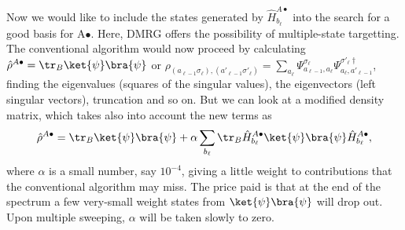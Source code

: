 Now we would like to include the states generated by $\hat{H}^{A\bullet}_{b_{\ell}}$ into the search for a good basis for A$\bullet$. Here, DMRG offers the possibility of multiple-state targetting. The conventional algorithm would now proceed by calculating $\hat{\rho}^{A\bullet} = \tr_B \ket{\psi}\bra{\psi}$ or $\rho_{(a_{\ell-1} \sigma_{\ell}),(a'_{\ell-1}  \sigma'_{\ell})} = \sum_{a_{\ell}} \Psi^{\sigma_{\ell}}_{a_{\ell-1},a_{\ell}}\Psi^{\sigma'_{\ell}\dagger}_{a_{\ell},a'_{\ell-1}}$, finding the eigenvalues (squares of the singular values), the eigenvectors (left singular vectors), truncation and so on. But we can look at a modified density matrix, which takes also into account the new terms as
\begin{equation}
\hat{\rho}^{A\bullet} = \tr_B \ket{\psi}\bra{\psi} + \alpha \sum_{b_{\ell}} \tr_B \hat{H}^{A\bullet}_{b_{\ell}} \ket{\psi} \bra{\psi} \hat{H}^{A\bullet}_{b_{\ell}} ,
\end{equation}
where $\alpha$ is a small number, say $10^{-4}$, giving a little weight to contributions that the conventional algorithm may miss. The price paid is that at the end of the spectrum a few very-small weight states from $\ket{\psi}\bra{\psi}$ will drop out. Upon multiple sweeping, $\alpha$ will be taken slowly to zero.

